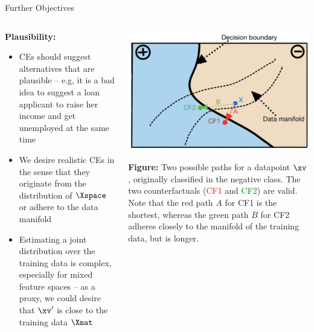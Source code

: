 \documentclass[11pt,compress,t,notes=noshow, aspectratio=169, xcolor=table]{beamer}
\begin{document}
\begin{frame}{Further Objectives}
	\begin{columns}
	\begin{column}{0.55\textwidth}
		\textbf{Plausibility:}
		\begin{itemize}
			\item CEs should suggest alternatives that are plausible -- e.g, it is a bad idea to suggest a loan applicant to raise her income and get unemployed at the same time
			\item We desire realistic CEs in the sense that they originate from the distribution of $\Xspace$ or adhere to the data manifold
			\item Estimating a joint distribution over the training data is complex, especially for mixed feature spaces -- as a proxy, we could desire that $\xv'$ is close to the training data $\Xmat$
		\end{itemize}
	\end{column}
	\begin{column}{0.4\textwidth}
			\begin{center}
			\includegraphics[width=1\textwidth]{figure/counterfactuals_obj}
		\end{center}

		\scriptsize{\textbf{Figure:} Two possible paths for a datapoint \textcolor{blue}{$\xv$},
			originally classified in the negative class. The two counterfactuals (\textcolor{red}{CF1} and \textcolor{green}{CF2}) are valid. Note that the red path $A$ for CF1 is the shortest, whereas the
			green path $B$ for CF2 adheres closely to the manifold of the training data, but is longer.}
		\vspace{0.3cm}
	\end{column}
	\end{columns}


\end{frame}
\end{document}
